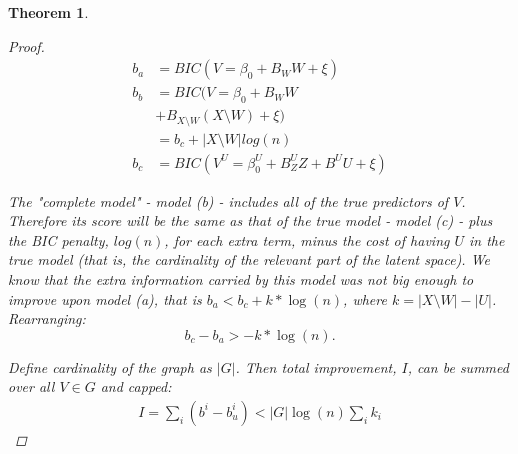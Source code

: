 \documentclass{article}
\newtheorem{theorem}{Theorem}
\begin{document}
\begin{theorem}
\begin{proof}
\begin{align}
b_{a} &= BIC(V = \beta_{0} + B_W W + \xi)  \\
b_{b} &= BIC(V = \beta_{0} + B_W W  \\
               &  + B_{X \setminus W} (X \setminus W) + \xi) \nonumber \\
&  = b_c + |X\setminus W| log(n) \nonumber \\
b_{c} &= BIC(V^U = \beta_{0}^U + B_Z^U Z + B^U U + \xi)
\end{align}

The "complete model" - model (b) - includes all of the true predictors of $V$.  Therefore its score will be the same as that of the true model - model (c) - plus the BIC penalty, $log(n)$, for each extra term, minus the cost of having $U$ in the true model (that is, the cardinality of the relevant part of the latent space).  We know that the extra information carried by this model was not big enough to improve upon model (a), that is $b_a < b_c + k * \log(n)$, where $k = |X \setminus W| - |U|$.  Rearranging:
\begin{equation}
    b_c - b_a > -k * \log(n).
    \label{eq:ceilingTheorem}
\end{equation}

Define cardinality of the graph as $|G|$.  Then total improvement, $I$, can be summed over all $V \in G$ and capped:
\begin{align}
I = \sum_i (b^i - b^i_u) < |G| \log(n) \sum_i k_i 
\end{align}

\end{proof}
\end{theorem}
\end{document}
